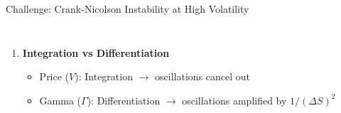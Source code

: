 \begin{frame}{Challenge: Crank-Nicolson Instability at High Volatility}
\begin{columns}
\begin{enumerate}
    \vspace{0.3em}
    \item \textbf{Integration vs Differentiation}
    \begin{itemize}
        \item Price ($V$): Integration $\rightarrow$ oscillations cancel out
        \item Gamma ($\Gamma$): Differentiation $\rightarrow$ oscillations amplified by $1/(\Delta S)^2$
    \end{itemize}
\end{enumerate}
\end{columns}

\end{frame}



